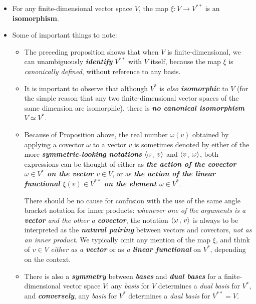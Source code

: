 \documentclass[11pt]{article}
\begin{document}
\begin{itemize}
\item \begin{proposition}
For any finite-dimensional vector space $V$, the map $\xi: V \rightarrow V^{**}$ is an \textbf{isomorphism}.
\end{proposition}

\item \begin{remark} Some of important things to note:
\begin{itemize}
\item The preceding proposition shows that when $V$ is finite-dimensional, we can unambiguously \textbf{\emph{identify}} $V^{**}$ with $V$ itself, because the map $\xi$ is \emph{canonically defined}, without reference to any basis. 

\item It is important to observe that although $V^{*}$ is \emph{also \textbf{isomorphic}} to $V$ (for the simple reason that any two finite-dimensional vector spaces of the same dimension are isomorphic), there is \emph{\textbf{no canonical isomorphism}} $V \simeq V^{*}$.

\item Because of Proposition above, the real number $\omega(v)$ obtained by applying a covector $\omega$ to a vector $v$ is sometimes denoted by either of the more \emph{\textbf{symmetric-looking notations}} $\left\langle \omega\,,\, v \right\rangle$ and $\left\langle v\,,\, \omega \right\rangle$, both expressions can be thought of either as \emph{\textbf{the action of the covector $\omega \in V^{*}$ on the vector $v \in V$}}, or as \emph{\textbf{the action of the linear functional $\xi(v) \in V^{**}$ on the element $\omega \in V^{*}$}}. 

There should be no cause for confusion with the use of the same angle bracket notation for inner products: \emph{whenever one of the arguments is a \textbf{vector} and the other a \textbf{covector}}, the notation $\left\langle \omega\,,\, v \right\rangle$ is always to be interpreted as the \emph{\textbf{natural pairing}} between vectors and covectors, \emph{not as an inner product}. We typically omit any mention of the map $\xi$, and think of $v \in V$ \emph{either as a \textbf{vector}} or as \emph{a \textbf{linear functional}} on $V^{*}$, depending on the context.

\item There is also a \textbf{\emph{symmetry}} between \emph{\textbf{bases}} and \emph{\textbf{dual bases}} for a finite-dimensional vector space $V$: any \emph{basis} for $V$ determines a \emph{dual basis} for $V^{*}$, and \emph{\textbf{conversely}}, any \emph{basis} for $V^{*}$ determines a \emph{dual basis} for $V^{**} = V$. 


\end{itemize}
\end{remark}
\end{itemize}
\end{document}
